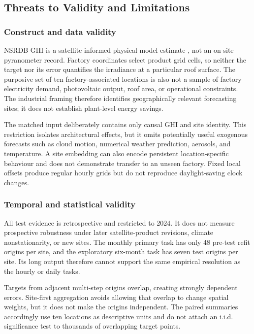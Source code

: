\subsection{Threats to Validity and Limitations}
\label{sec:limitations}

\subsubsection{Construct and data validity}

NSRDB GHI is a satellite-informed physical-model estimate
\cite{sengupta2018}, not an on-site pyranometer record. Factory coordinates
select product grid cells, so neither the target nor its error quantifies the
irradiance at a particular roof surface. The purposive set of ten
factory-associated locations is also not a sample of factory electricity
demand, photovoltaic output, roof area, or operational constraints. The
industrial framing therefore identifies geographically relevant forecasting
sites; it does not establish plant-level energy savings.

The matched input deliberately contains only causal GHI and site identity.
This restriction isolates architectural effects, but it omits potentially
useful exogenous forecasts such as cloud motion, numerical weather prediction,
aerosols, and temperature. A site embedding can also encode persistent
location-specific behaviour and does not demonstrate transfer to an unseen
factory. Fixed local offsets produce regular hourly grids but do not reproduce
daylight-saving clock changes.

\subsubsection{Temporal and statistical validity}

All test evidence is retrospective and restricted to 2024. It does not measure
prospective robustness under later satellite-product revisions, climate
nonstationarity, or new sites. The monthly primary task has only 48 pre-test
refit origins per site, and the exploratory six-month task has seven test
origins per site. Its long output therefore cannot support the same empirical
resolution as the hourly or daily tasks.

Targets from adjacent multi-step origins overlap, creating strongly dependent
errors. Site-first aggregation avoids allowing that overlap to change spatial
weights, but it does not make the origins independent. The paired summaries
accordingly use ten locations as descriptive units and do not attach an
i.i.d. significance test to thousands of overlapping target points.


